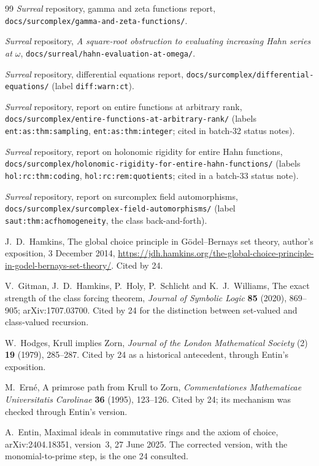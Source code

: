 \documentclass[11pt,letterpaper]{article}
\numberwithin{equation}{section}
\theoremstyle{definition}
\theoremstyle{remark}
\theoremstyle{plain}
\begin{document}
\begin{thebibliography}{99}
\emph{Surreal} repository, gamma and zeta functions report,
\texttt{docs/surcomplex/gamma-and-zeta-functions/}.

\emph{Surreal} repository, \emph{A square-root obstruction to evaluating increasing Hahn series at
$\omega$}, \texttt{docs/surreal/hahn-evaluation-at-omega/}.

\emph{Surreal} repository, differential equations report,
\texttt{docs/surcomplex/differential-equations/} (label \nolinkurl{diff:warn:ct}).

\emph{Surreal} repository, report on entire functions at arbitrary rank,
\texttt{docs/surcomplex/entire-functions-at-arbitrary-rank/} (labels \nolinkurl{ent:as:thm:sampling},
\nolinkurl{ent:as:thm:integer}; cited in batch-32 status notes).

\emph{Surreal} repository, report on holonomic rigidity for entire Hahn functions,
\texttt{docs/surcomplex/holonomic-rigidity-for-entire-hahn-functions/} (labels \nolinkurl{hol:rc:thm:coding},
\nolinkurl{hol:rc:rem:quotients}; cited in a batch-33 status note).

\emph{Surreal} repository, report on surcomplex field automorphisms, \texttt{docs/surcomplex/surcomplex-field-automorphisms/}
(label \nolinkurl{saut:thm:acfhomogeneity}, the class back-and-forth).

J.~D.~Hamkins, The global choice principle in G\"odel--Bernays set theory, author's exposition, 3 December 2014,
\url{https://jdh.hamkins.org/the-global-choice-principle-in-godel-bernays-set-theory/}. Cited by 24.

V.~Gitman, J.~D.~Hamkins, P.~Holy, P.~Schlicht and K.~J.~Williams, The exact strength of the class forcing theorem, \emph{Journal of Symbolic
Logic} \textbf{85} (2020), 869--905; arXiv:1707.03700. Cited by 24 for the distinction between set-valued and class-valued recursion.

W.~Hodges, Krull implies Zorn, \emph{Journal of the London Mathematical Society} (2) \textbf{19} (1979), 285--287. Cited by 24 as a historical
antecedent, through Entin's exposition.

M.~Ern\'e, A primrose path from Krull to Zorn, \emph{Commentationes Mathematicae Universitatis Carolinae} \textbf{36} (1995), 123--126. Cited by 24;
its mechanism was checked through Entin's version.

A.~Entin, Maximal ideals in commutative rings and the axiom of choice, arXiv:2404.18351, version~3, 27 June 2025. The corrected version, with the
monomial-to-prime step, is the one 24 consulted.


\end{thebibliography}
\end{document}
